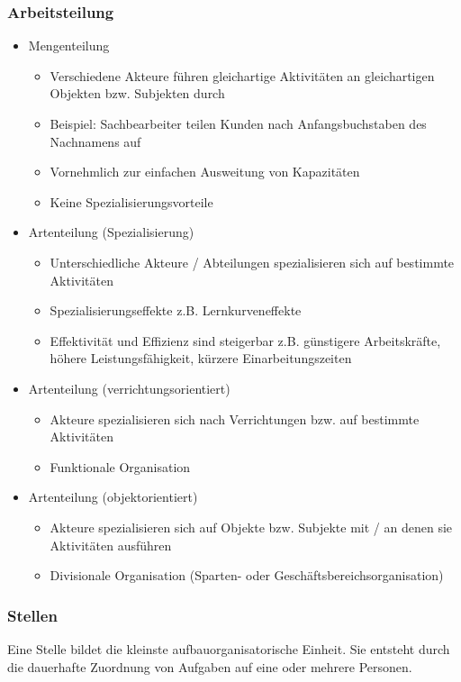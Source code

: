 \subsubsection{Arbeitsteilung}
\begin{itemize}
	\item Mengenteilung
	\begin{itemize}
		\item Verschiedene Akteure führen gleichartige Aktivitäten an gleichartigen	Objekten bzw. Subjekten durch
		\item Beispiel: Sachbearbeiter teilen Kunden nach Anfangsbuchstaben	des Nachnamens auf
		\item Vornehmlich zur einfachen Ausweitung von Kapazitäten
		\item Keine Spezialisierungsvorteile
	\end{itemize}
	\item  Artenteilung (Spezialisierung)
	\begin{itemize}
		\item Unterschiedliche Akteure / Abteilungen spezialisieren sich auf bestimmte Aktivitäten
		\item Spezialisierungseffekte z.B. Lernkurveneffekte
		\item Effektivität und Effizienz sind steigerbar z.B. günstigere Arbeitskräfte, höhere Leistungsfähigkeit, kürzere Einarbeitungszeiten
	\end{itemize}
	\item  Artenteilung (verrichtungsorientiert)
	\begin{itemize}
		\item Akteure spezialisieren sich nach Verrichtungen bzw. auf bestimmte	Aktivitäten
		\item Funktionale Organisation
	\end{itemize}
	\item  Artenteilung (objektorientiert)
	\begin{itemize}
		\item Akteure spezialisieren sich auf Objekte bzw. Subjekte mit / an denen sie Aktivitäten ausführen
		\item Divisionale Organisation (Sparten- oder Geschäftsbereichsorganisation)
	\end{itemize}
\end{itemize}

\subsubsection{Stellen}
Eine Stelle bildet die kleinste aufbauorganisatorische Einheit. Sie entsteht durch die dauerhafte Zuordnung von Aufgaben auf eine oder mehrere Personen. 


